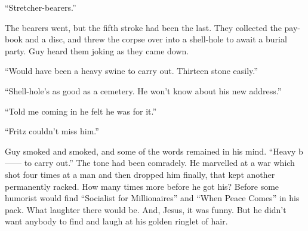 ``Stretcher-bearers.''

The bearers went, but the fifth stroke had been the last. They collected the pay-book and a disc, and threw the corpse over into a shell-hole to await a burial party. Guy heard them joking as they came down.

``Would have been a heavy swine to carry out. Thirteen stone easily.''

``Shell-hole's as good as a cemetery. He won't know about his new address.''

``Told me coming in he felt he was for it.''

``Fritz couldn't miss him.''

Guy smoked and smoked, and some of the words remained in his mind. ``Heavy b------ to carry out.'' The tone had been comradely. He marvelled at a war which shot four times at a man and then dropped him finally, that kept another permanently racked. How many times more before he got his? Before some humorist would find ``Socialist for Millionaires'' and ``When Peace Comes'' in his pack. What laughter there would be. And, Jesus, it was funny. But he didn't want anybody to find and laugh at his golden ringlet of hair.



